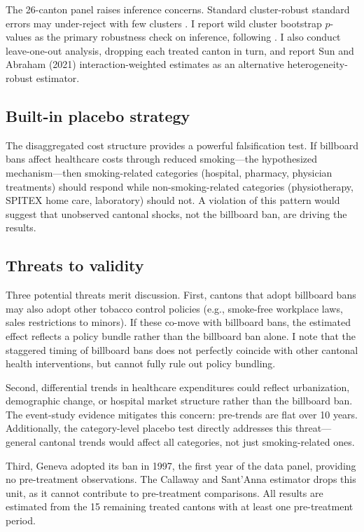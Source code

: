 \documentclass[12pt]{article}
\begin{document}
The 26-canton panel raises inference concerns. Standard cluster-robust standard errors may under-reject with few clusters \citep{cameron2008bootstrap}. I report wild cluster bootstrap $p$-values as the primary robustness check on inference, following \citet{roodman2019fast}. I also conduct leave-one-out analysis, dropping each treated canton in turn, and report Sun and Abraham (2021) interaction-weighted estimates as an alternative heterogeneity-robust estimator.

\subsection{Built-in placebo strategy}

The disaggregated cost structure provides a powerful falsification test. If billboard bans affect healthcare costs through reduced smoking---the hypothesized mechanism---then smoking-related categories (hospital, pharmacy, physician treatments) should respond while non-smoking-related categories (physiotherapy, SPITEX home care, laboratory) should not. A violation of this pattern would suggest that unobserved cantonal shocks, not the billboard ban, are driving the results.

\subsection{Threats to validity}

Three potential threats merit discussion. First, cantons that adopt billboard bans may also adopt other tobacco control policies (e.g., smoke-free workplace laws, sales restrictions to minors). If these co-move with billboard bans, the estimated effect reflects a policy bundle rather than the billboard ban alone. I note that the staggered timing of billboard bans does not perfectly coincide with other cantonal health interventions, but cannot fully rule out policy bundling.

Second, differential trends in healthcare expenditures could reflect urbanization, demographic change, or hospital market structure rather than the billboard ban. The event-study evidence mitigates this concern: pre-trends are flat over 10 years. Additionally, the category-level placebo test directly addresses this threat---general cantonal trends would affect all categories, not just smoking-related ones.

Third, Geneva adopted its ban in 1997, the first year of the data panel, providing no pre-treatment observations. The Callaway and Sant'Anna estimator drops this unit, as it cannot contribute to pre-treatment comparisons. All results are estimated from the 15 remaining treated cantons with at least one pre-treatment period.
\end{document}

